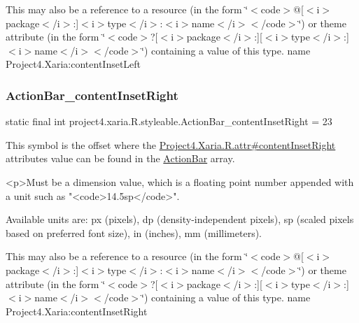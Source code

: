 This may also be a reference to a resource (in the form \char`\"{}$<$code$>$@\mbox{[}$<$i$>$package$<$/i$>$\+:\mbox{]}$<$i$>$type$<$/i$>$\+:$<$i$>$name$<$/i$>$$<$/code$>$\char`\"{}) or theme attribute (in the form \char`\"{}$<$code$>$?\mbox{[}$<$i$>$package$<$/i$>$\+:\mbox{]}\mbox{[}$<$i$>$type$<$/i$>$\+:\mbox{]}$<$i$>$name$<$/i$>$$<$/code$>$\char`\"{}) containing a value of this type.  name Project4.\+Xaria\+:content\+Inset\+Left \mbox{\label{classproject4_1_1xaria_1_1R_1_1styleable_a214d077d9e00a3988b431a70cd90e71e}} 
\subsubsection{\texorpdfstring{Action\+Bar\+\_\+content\+Inset\+Right}{ActionBar\_contentInsetRight}}
{\footnotesize\ttfamily static final int project4.\+xaria.\+R.\+styleable.\+Action\+Bar\+\_\+content\+Inset\+Right = 23\hspace{0.3cm}{\ttfamily [static]}}

This symbol is the offset where the \hyperlink{}{Project4.\+Xaria.\+R.\+attr\#content\+Inset\+Right} attribute\textquotesingle{}s value can be found in the \hyperlink{classproject4_1_1xaria_1_1R_1_1styleable_accb530194c58ee3abb15587da8869e99}{Action\+Bar} array.

\begin{DoxyVerb}      <p>Must be a dimension value, which is a floating point number appended with a unit such as "<code>14.5sp</code>".
\end{DoxyVerb}
 Available units are\+: px (pixels), dp (density-\/independent pixels), sp (scaled pixels based on preferred font size), in (inches), mm (millimeters). 

This may also be a reference to a resource (in the form \char`\"{}$<$code$>$@\mbox{[}$<$i$>$package$<$/i$>$\+:\mbox{]}$<$i$>$type$<$/i$>$\+:$<$i$>$name$<$/i$>$$<$/code$>$\char`\"{}) or theme attribute (in the form \char`\"{}$<$code$>$?\mbox{[}$<$i$>$package$<$/i$>$\+:\mbox{]}\mbox{[}$<$i$>$type$<$/i$>$\+:\mbox{]}$<$i$>$name$<$/i$>$$<$/code$>$\char`\"{}) containing a value of this type.  name Project4.\+Xaria\+:content\+Inset\+Right \mbox{\label{classproject4_1_1xaria_1_1R_1_1styleable_a9212bf97d9d5252fd23d430335413682}} 
